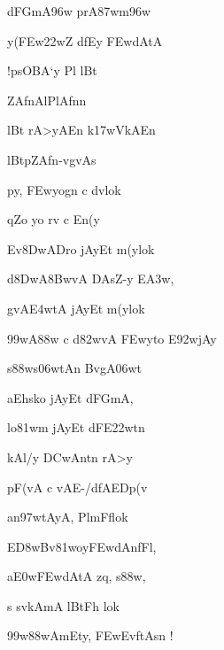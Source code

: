 \dnnemslokad 
{\dn {}dFG\0mA\396w prA\387wm\396w \vegdn\dontdisplaylinenum}


\ujvers\dnnemsloka 
{\dn y(\3FEw\?\322wZ\2 df\0Ey\2 \3FEwdAtA}
\dontdisplaylinenum

\dnnemslokab 
{\dn {}!psOBA`y Pl\2 lB\?t \dandadn\dontdisplaylinenum}

\dnnemslokac 
{\dn {}ZAfnAlPlAfn\?n}
\dontdisplaylinenum

\dnnemslokad 
{\dn lB\?t rA>yAEn k\317wVkAEn \vegdn\dontdisplaylinenum}


\ujvers\dnnemsloka 
{\dn lB\?tpZA\0fn-vg\0vAs}
\dontdisplaylinenum

\dnnemslokab 
{\dn py, \3FEwyog\?n c d\?vlok\? \dandadn\dontdisplaylinenum}

\dnnemslokac 
{\dn {}qZo yo rv\? c En(y}
\dontdisplaylinenum

\dnnemslokad 
{\dn Ev\38DwADro jAyEt m(y\0lok\? \vegdn\dontdisplaylinenum}


\ujvers\dnnemsloka 
{\dn d\38DwA\38BwvA\2 DAsZ-y E\3A3w,}
\dontdisplaylinenum

\dnnemslokab 
{\dn gvA\3E4wtA\2 jAyEt m(y\0lok\? \dandadn\dontdisplaylinenum}

\dnnemslokac 
{\dn \399wA\388w\2 c d\382wvA \3FEwyto E\392wjAy}
\dontdisplaylinenum

\dnnemslokad 
{\dn s\388ws\306wtAn Bv\?gA\306wt\? \vegdn\dontdisplaylinenum}


\ujvers\dnnemsloka 
{\dn aEh\2sko jAyEt dFG\0mA,}
\dontdisplaylinenum

\dnnemslokab 
{\dn {}lo\381wm\2 jAyEt dFE\322wt\?n \dandadn\dontdisplaylinenum}

\dnnemslokac 
{\dn kAl/y\2 \3DCwAnt\?n rA>y\2}
\dontdisplaylinenum

\dnnemslokad 
{\dn pF(vA c vAE-/dfAEDp(v \vegdn\dontdisplaylinenum}


\ujvers\dnnemsloka 
{\dn an\397wtAyA, PlmFflok\?}
\dontdisplaylinenum

\dnnemslokab 
{\dn {}E\3D8wB\0v\?\381woy\3FEwdAnfFl, \dandadn\dontdisplaylinenum}

\dnnemslokac 
{\dn a\3E0w\3FEwdAtA zq, s\388w,}
\dontdisplaylinenum

\dnnemslokad 
{\dn s sv\0kAmA lBtFh lok\? \vegdn\dontdisplaylinenum}


\ujvers\dnnemsloka 
{\dn \399w\388wAmEty\0, \3FEwEvf\?tAsn\2 {\rs !\re}}
\dontdisplaylinenum

